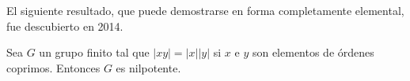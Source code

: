 

El siguiente resultado, que puede demostrarse en forma
completamente elemental, fue descubierto en 2014. 

\begin{theorem}
	Sea $G$ un grupo finito tal que $|xy|=|x||y|$ si $x$ e $y$ son elementos de
	órdenes coprimos. Entonces $G$ es nilpotente.
\end{theorem}

